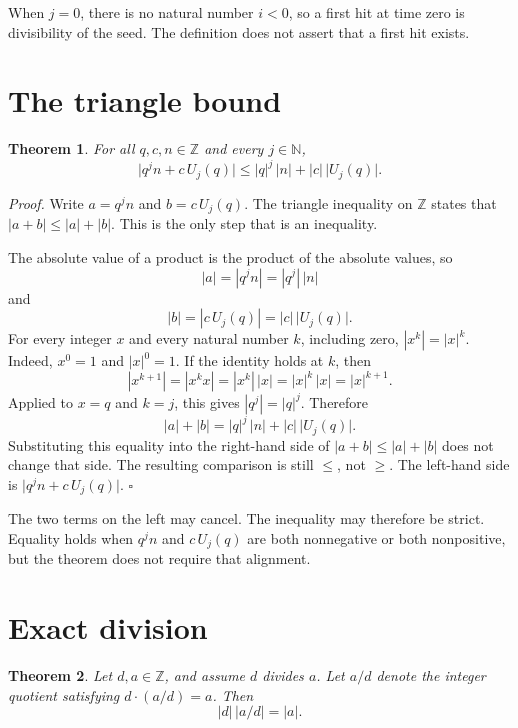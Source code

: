\documentclass[11pt,letterpaper]{article}
\newcommand{\N}{\mathbb{N}}
\newcommand{\Z}{\mathbb{Z}}
\newtheorem{theorem}{Theorem}
\newenvironment{proof}{\noindent\textit{Proof.}}{\hfill\(\square\)}
\begin{document}
When \(j=0\), there is no natural number \(i<0\), so a first hit at time zero
is divisibility of the seed. The definition does not assert that a first hit
exists.

\section{The triangle bound}

\begin{theorem}
\label{thm:affine-triangle}
For all \(q,c,n\in\Z\) and every \(j\in\N\),
\[
\bigl|q^{j}n+c\,U_{j}(q)\bigr|
\le |q|^{j}\,|n|+|c|\,\bigl|U_{j}(q)\bigr|.
\]
\end{theorem}

\begin{proof}
Write \(a=q^{j}n\) and \(b=c\,U_{j}(q)\). The triangle inequality on \(\Z\)
states that \(|a+b|\le |a|+|b|\). This is the only step that is an inequality.

The absolute value of a product is the product of the absolute values, so
\[
|a|=|q^{j}n|=|q^{j}|\,|n|
\]
and
\[
|b|=|c\,U_{j}(q)|=|c|\,\bigl|U_{j}(q)\bigr|.
\]
For every integer \(x\) and every natural number \(k\), including zero,
\(|x^{k}|=|x|^{k}\). Indeed, \(x^{0}=1\) and \(|x|^{0}=1\). If the identity
holds at \(k\), then
\[
|x^{k+1}|=|x^{k}x|=|x^{k}|\,|x|=|x|^{k}\,|x|=|x|^{k+1}.
\]
Applied to \(x=q\) and \(k=j\), this gives \(|q^{j}|=|q|^{j}\). Therefore
\[
|a|+|b|=|q|^{j}\,|n|+|c|\,\bigl|U_{j}(q)\bigr|.
\]
Substituting this equality into the right-hand side of
\(|a+b|\le |a|+|b|\) does not change that side. The resulting comparison is
still \(\le\), not \(\ge\). The left-hand side is
\(\bigl|q^{j}n+c\,U_{j}(q)\bigr|\).
\end{proof}

The two terms on the left may cancel. The inequality may therefore be strict.
Equality holds when \(q^{j}n\) and \(c\,U_{j}(q)\) are both nonnegative or both
nonpositive, but the theorem does not require that alignment.

\section{Exact division}

\begin{theorem}
\label{thm:exact-division}
Let \(d,a\in\Z\), and assume \(d\) divides \(a\). Let \(a/d\) denote the
integer quotient satisfying \(d\cdot(a/d)=a\). Then
\[
|d|\,\bigl|a/d\bigr|=|a|.
\]
\end{theorem}
\end{document}
